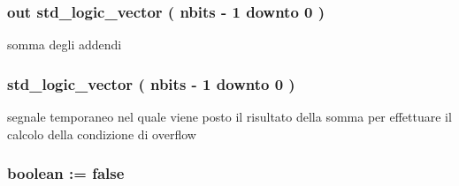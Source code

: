 \hypertarget{group___adder_ga01f6ea3ddb4d1519676217bcb5959de8}{
\subsubsection[{sum}]{ {\bfseries \textcolor{vhdlchar}{out}\textcolor{vhdlchar}{ }} {\bfseries \textcolor{vhdlchar}{std\+\_\+logic\+\_\+vector}\textcolor{vhdlchar}{ }\textcolor{vhdlchar}{(}\textcolor{vhdlchar}{ }\textcolor{vhdlchar}{ }\textcolor{vhdlchar}{ }\textcolor{vhdlchar}{ }{\bfseries {\bf nbits}} \textcolor{vhdlchar}{-\/}\textcolor{vhdlchar}{ } \textcolor{vhdldigit}{1} \textcolor{vhdlchar}{ }\textcolor{vhdlchar}{downto}\textcolor{vhdlchar}{ }\textcolor{vhdlchar}{ } \textcolor{vhdldigit}{0} \textcolor{vhdlchar}{ }\textcolor{vhdlchar}{)}\textcolor{vhdlchar}{ }} \hspace{0.3cm}{\ttfamily [Port]}}}\label{group___adder_ga01f6ea3ddb4d1519676217bcb5959de8}


somma degli addendi 

\hypertarget{group___adder_ga590914af948ec283f1371002f2f76720}{
\subsubsection[{sum\+\_\+tmp}]{ {\bfseries \textcolor{vhdlchar}{std\+\_\+logic\+\_\+vector}\textcolor{vhdlchar}{ }\textcolor{vhdlchar}{(}\textcolor{vhdlchar}{ }\textcolor{vhdlchar}{ }\textcolor{vhdlchar}{ }\textcolor{vhdlchar}{ }{\bfseries {\bf nbits}} \textcolor{vhdlchar}{-\/}\textcolor{vhdlchar}{ } \textcolor{vhdldigit}{1} \textcolor{vhdlchar}{ }\textcolor{vhdlchar}{downto}\textcolor{vhdlchar}{ }\textcolor{vhdlchar}{ } \textcolor{vhdldigit}{0} \textcolor{vhdlchar}{ }\textcolor{vhdlchar}{)}\textcolor{vhdlchar}{ }} \hspace{0.3cm}{\ttfamily [Signal]}}}\label{group___adder_ga590914af948ec283f1371002f2f76720}


segnale temporaneo nel quale viene posto il risultato della somma per effettuare il calcolo della condizione di overflow 

\hypertarget{group___adder_gadf05ca347ec6d3c85740dc697469b3db}{
\subsubsection[{use\+\_\+custom}]{ {\bfseries \textcolor{vhdlchar}{ }} {\bfseries \textcolor{vhdlchar}{boolean}\textcolor{vhdlchar}{ }\textcolor{vhdlchar}{ }\textcolor{vhdlchar}{\+:}\textcolor{vhdlchar}{=}\textcolor{vhdlchar}{ }\textcolor{vhdlchar}{ }\textcolor{vhdlchar}{ }\textcolor{vhdlchar}{ }\textcolor{vhdlchar}{false}\textcolor{vhdlchar}{ }} \hspace{0.3cm}{\ttfamily [Generic]}}}\label{group___adder_gadf05ca347ec6d3c85740dc697469b3db}


